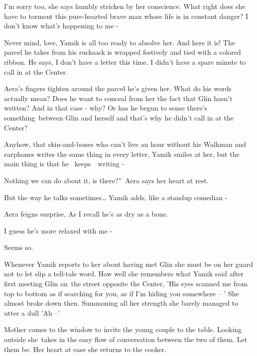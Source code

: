 \documentclass[twoside,11pt]{book}
\begin{document}
{\textquotedbl}I'm sorry too,{\textquotedbl} she says humbly stricken by her conscience. What right does she have to
torment this pure-hearted brave man whose life is in constant danger? {\textquotedbl}I don't know what's happening to
me -{\textquotedbl}

{\textquotedbl}Never mind, love,{\textquotedbl} Yamik is all too ready to absolve her. {\textquotedbl}And here it
is!{\textquotedbl} The parcel he takes from his rucksack is wrapped festively and tied with a colored ribbon. He says,
{\textquotedbl}I don't have a letter this time. I didn't have a spare minute to call in at the Center.{\textquotedbl} 

Aera's fingers tighten around the parcel he's given her. What do his words actually mean? Does he want to conceal from
her the fact that Glin hasn't written? And in that case - why? Or has he begun to sense there's something\ between Glin
and herself and that's why he didn't call in at the Center?

{\textquotedbl}Anyhow, that skin-and-bones who can't live an hour without his Walkman and earphones writes the same
thing in every letter,{\textquotedbl} Yamik smiles at her, {\textquotedbl}but the main thing is that he
\ keeps\ \ writing -{\textquotedbl} 

{\textquotedbl}Nothing we can do about it, is there?''~Aera says her heart at rest.

{\textquotedbl}But the way he talks sometimes{\dots}{\textquotedbl} Yamik adds, {\textquotedbl}like a standup comedian
-{\textquotedbl} 

Aera feigns surprise, {\textquotedbl}As I recall he's as dry as a bone.{\textquotedbl}

{\textquotedbl}I guess he's more relaxed with me -{\textquotedbl} 

{\textquotedbl}Seems so.{\textquotedbl} 

 Whenever Yamik reports to her about having met Glin she must be on her guard not to let slip a tell-tale word. How well
she remembers what Yamik said after first meeting Glin on~the street opposite the Center, 'His eyes scanned me from top
to bottom as if searching for you, as if I'm hiding you somewhere -- ' She almost broke down then. Summoning all her
strength she barely managed to utter a dull 'Ah --' 

Mother comes to the window to invite the young couple to the table. Looking outside she{\ }takes in the
easy flow of conversation between the two of them. Let them be. Her heart at ease she returns to the cooker.
\end{document}
